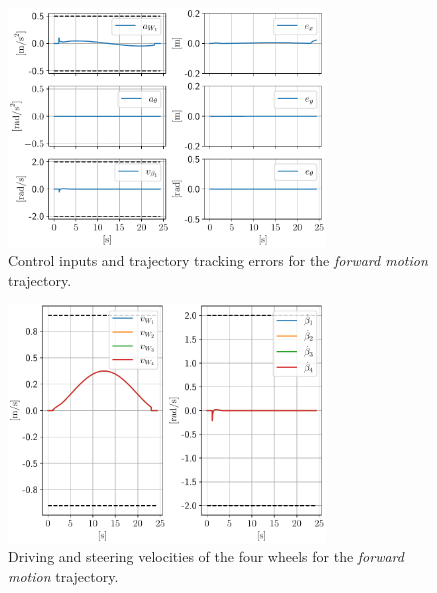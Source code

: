 \begin{figure}
    \centering
    \includegraphics[width=0.75\textwidth]{figures/SWMR/simulations/forward/inputs_and_errors.pdf}
    \caption{Control inputs and trajectory tracking errors for the \textit{forward motion} trajectory.}
    \label{fig:simulations:forward:inputs-and-errors}
\end{figure}
\begin{figure}
    \centering
    \includegraphics[width=0.75\textwidth]{figures/SWMR/simulations/forward/wheels_velocities.pdf}
    \caption{Driving and steering velocities of the four wheels for the \textit{forward motion} trajectory.}
    \label{fig:simulations:forward:wheel-velocities}
\end{figure}

